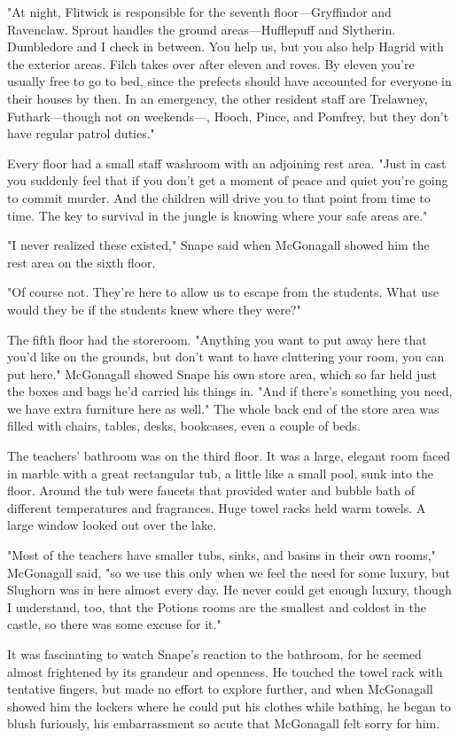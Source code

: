 "At night, Flitwick is responsible for the seventh floor—Gryffindor and Ravenclaw. Sprout handles the ground areas—Hufflepuff and Slytherin. Dumbledore and I check in between. You help us, but you also help Hagrid with the exterior areas. Filch takes over after eleven and roves. By eleven you're usually free to go to bed, since the prefects should have accounted for everyone in their houses by then. In an emergency, the other resident staff are Trelawney, Futhark—though not on weekends—, Hooch, Pince, and Pomfrey, but they don't have regular patrol duties."

Every floor had a small staff washroom with an adjoining rest area. "Just in cast you suddenly feel that if you don't get a moment of peace and quiet you're going to commit murder. And the children will drive you to that point from time to time. The key to survival in the jungle is knowing where your safe areas are."

"I never realized these existed," Snape said when McGonagall showed him the rest area on the sixth floor.

"Of course not. They're here to allow us to escape from the students. What use would they be if the students knew where they were?"

The fifth floor had the storeroom. "Anything you want to put away here that you'd like on the grounds, but don't want to have cluttering your room, you can put here." McGonagall showed Snape his own store area, which so far held just the boxes and bags he'd carried his things in. "And if there's something you need, we have extra furniture here as well." The whole back end of the store area was filled with chairs, tables, desks, bookcases, even a couple of beds.

The teachers' bathroom was on the third floor. It was a large, elegant room faced in marble with a great rectangular tub, a little like a small pool, sunk into the floor. Around the tub were faucets that provided water and bubble bath of different temperatures and fragrances. Huge towel racks held warm towels. A large window looked out over the lake.

"Most of the teachers have smaller tubs, sinks, and basins in their own rooms," McGonagall said, "so we use this only when we feel the need for some luxury, but Slughorn was in here almost every day. He never could get enough luxury, though I understand, too, that the Potions rooms are the smallest and coldest in the castle, so there was some excuse for it."

It was fascinating to watch Snape's reaction to the bathroom, for he seemed almost frightened by its grandeur and openness. He touched the towel rack with tentative fingers, but made no effort to explore further, and when McGonagall showed him the lockers where he could put his clothes while bathing, he began to blush furiously, his embarrassment so acute that McGonagall felt sorry for him.

